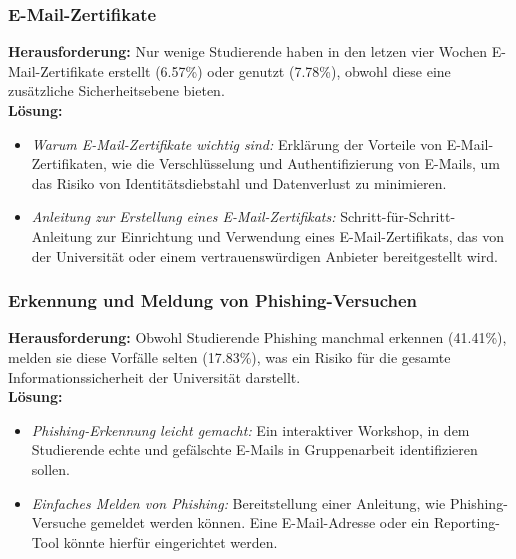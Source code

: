 \documentclass[german,report]{i1thesis}
\begin{document}
\subsubsection{E-Mail-Zertifikate}
\textbf{Herausforderung:} Nur wenige Studierende haben in den letzen vier Wochen E-Mail-Zertifikate erstellt (6.57\%) oder genutzt (7.78\%), obwohl diese eine zusätzliche Sicherheitsebene bieten.\\
\textbf{Lösung:}
\begin{itemize}
    \item \textit{Warum E-Mail-Zertifikate wichtig sind:} Erklärung der Vorteile von E-Mail-Zertifikaten, wie die Verschlüsselung und Authentifizierung von E-Mails, um das Risiko von Identitätsdiebstahl und Datenverlust zu minimieren.
    \item \textit{Anleitung zur Erstellung eines E-Mail-Zertifikats:} Schritt-für-Schritt-Anleitung zur Einrichtung und Verwendung eines E-Mail-Zertifikats, das von der Universität oder einem vertrauenswürdigen Anbieter bereitgestellt wird.
\end{itemize}

\subsubsection{Erkennung und Meldung von Phishing-Versuchen}
\textbf{Herausforderung:} Obwohl Studierende Phishing manchmal erkennen (41.41\%), melden sie diese Vorfälle selten (17.83\%), was ein Risiko für die gesamte Informationssicherheit der Universität darstellt.\\
\textbf{Lösung:}
\begin{itemize}
    \item \textit{Phishing-Erkennung leicht gemacht:} Ein interaktiver Workshop, in dem Studierende echte und gefälschte E-Mails in Gruppenarbeit identifizieren sollen.
    \item \textit{Einfaches Melden von Phishing:} Bereitstellung einer Anleitung, wie Phishing-Versuche gemeldet werden können. Eine E-Mail-Adresse oder ein Reporting-Tool könnte hierfür eingerichtet werden.
\end{itemize}
\end{document}
